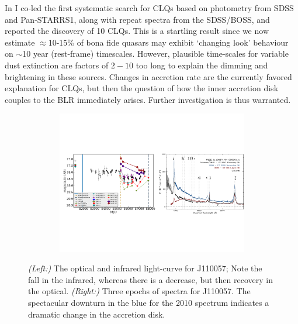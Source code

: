 \smallskip \smallskip
\noindent 
In \citet{MacLeod2016} I co-led the first systematic search for CLQs
based on photometry from SDSS and Pan-STARRS1, along with repeat
spectra from the SDSS/BOSS, and reported the discovery of 10
CLQs. This is a startling result since we now estimate
$\approx$10-15\% of bona fide quasars may exhibit `changing look'
behaviour on $\sim$10 year (rest-frame) timescales. However, plausible
time-scales for variable dust extinction are factors of $2-10$ too
long to explain the dimming and brightening in these sources.  Changes
in accretion rate are the currently favored explanation for CLQs, but
then the question of how the inner accretion disk couples to the BLR
immediately arises. Further investigation is thus warranted.

\begin{figure}[h]
  \begin{center}
    \hspace{-0.5cm}
    \includegraphics[height=6.25cm,width=17.2cm]
    {figures/J110057_LC_Spectra_20171024.pdf}
    \vspace{-10pt}
    \caption{%
      \footnotesize 
      {\it (Left:)} The optical and infrared light-curve for J110057; 
      Note the fall in the infrared, whereas there is a decrease, but 
      then recovery in the optical. 
      {\it (Right:)} 
      Three epochs of spectra for J110057. 
      The spectacular downturn in the blue for the 2010 spectrum 
      indicates a dramatic change in the accretion disk.
    }
  \vspace{-16pt}
 \label{fig:J110057}
\end{center}
\end{figure}

